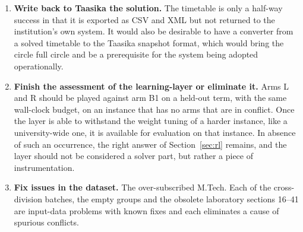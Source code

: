 \begin{enumerate}
  \item \textbf{Write back to Taasika the solution.} The timetable is only a half-way success in
    that it is exported as CSV and XML but not returned to the institution's own system. It would
    also be desirable to have a converter from a solved timetable to the Taasika snapshot format,
    which would bring the circle full circle and be a prerequisite for the system being adopted
    operationally.

  \item \textbf{Finish the assessment of the learning-layer or eliminate it.} Arms L and R should
    be played against arm B1 on a held-out term, with the same wall-clock budget, on an instance
    that has no arms that are in conflict. Once the layer is able to withstand the weight tuning
    of a harder instance, like a university-wide one, it is available for evaluation on that
    instance. In absence of such an occurrence, the right answer of Section~\ref{sec:rl} remains,
    and the layer should not be considered a solver part, but rather a piece of instrumentation.

  \item \textbf{Fix issues in the dataset.} The over-subscribed M.Tech. Each of the
    cross-division batches, the empty groups and the obsolete laboratory sections 16--41 are
    input-data problems with known fixes and each eliminates a cause of spurious conflicts.
\end{enumerate}
